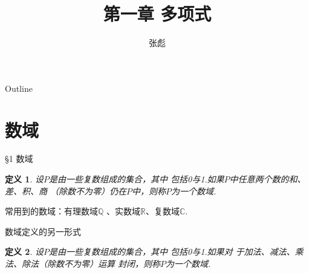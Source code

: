 \documentclass[13pt,fontset=mac]{ctexbeamer}
\newtheorem*{defi}{定义}
\begin{document}
\title[]{第一章 \quad 多项式}
\author[]{{\large 张彪}\\  }

\date{}


\AtBeginSection[]
{
\setcounter{exa}{0}
\setcounter{equation}{0}
}


\begin{frame}
\maketitle
\end{frame}

\begin{frame}{Outline}
	\tableofcontents
\end{frame}

\section{数域}
\begin{frame}{\S 1    数域}

\begin{defi}
设$P$是由一些复数组成的集合，其中
	包括0与1.如果$P$中任意两个数的和、差、积、商
	（除数不为零）仍在$P$中，则称$P$为一个数域.
\end{defi}

   常用到的数域：有理数域$\mathbb{Q}$ 、实数域$\mathbb{R}$、复数域$\mathbb{C}$.
   
   \vspace{10pt}
数域定义的另一形式  
\begin{defi}
	设$P$是由一些复数组成的集合，其中
	包括0与1.如果对
	于加法、减法、乘法、除法（除数不为零）运算
	封闭，则称$P$为一个数域.
\end{defi}


\end{frame}
\end{document}
